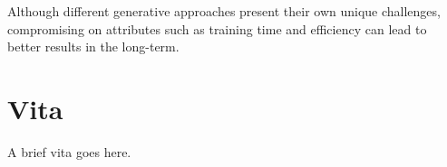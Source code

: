 \documentclass[final]{ukthesis}
\begin{document}
Although different generative approaches present their own unique challenges, compromising on attributes such as training time and efficiency can lead to better results in the long-term.



\copyrightnotice
\backmatter

\chapter{Vita}
A brief vita goes here.
\end{document}
